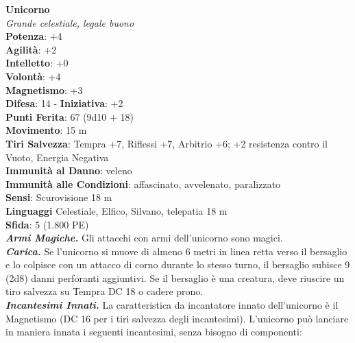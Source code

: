 \begin{multicols}{2}
\medskip\textbf{Unicorno}\\
\emph{Grande celestiale, legale buono}\\
\textbf{Potenza}: +4\\
\textbf{Agilità}: +2\\
\textbf{Intelletto}: +0\\
\textbf{Volontà}: +4\\
\textbf{Magnetismo}: +3\\
\textbf{Difesa}: 14 - \textbf{Iniziativa}: +2\\
\textbf{Punti Ferita}: 67 (9d10 + 18)\\
\textbf{Movimento}: 15 m\\
\textbf{Tiri Salvezza}: Tempra +7, Riflessi +7, Arbitrio +6; +2 resistenza contro il Vuoto, Energia Negativa\\
\textbf{Immunità al Danno}: veleno\\
\textbf{Immunità alle Condizioni}: affascinato, avvelenato, paralizzato\\
\textbf{Sensi}: Scurovisione 18 m\\
\textbf{Linguaggi} Celestiale, Elfico, Silvano, telepatia 18 m\\
\textbf{Sfida}: 5 (1.800 PE)\smallskip\\
\emph{\textbf{Armi Magiche.}} Gli attacchi con armi dell'unicorno sono magici.\\
\emph{\textbf{Carica.}} Se l'unicorno si muove di almeno 6 metri in linea retta verso il bersaglio e lo colpisce con un attacco di corno durante lo stesso turno, il bersaglio subisce 9 (2d8) danni perforanti aggiuntivi. Se il bersaglio è una creatura, deve riuscire un tiro salvezza su Tempra DC  18 o cadere prono.\\

\emph{\textbf{Incantesimi Innati.}} La caratteristica da incantatore innato dell'unicorno è il Magnetismo (DC  16 per i tiri salvezza degli incantesimi). L'unicorno può lanciare in maniera innata i seguenti incantesimi, senza bisogno di componenti:\\


\end{multicols}
